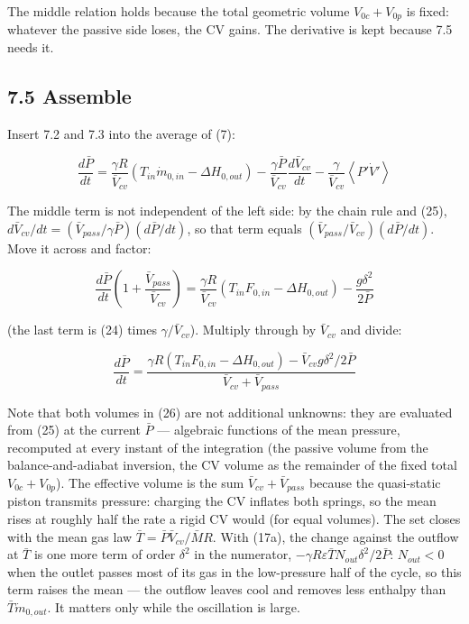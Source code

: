 \documentclass[11pt]{article}
\begin{document}
The middle relation holds because the total geometric volume $V_{0c} + V_{0p}$ is fixed: whatever the passive side loses, the CV gains. The derivative is kept because 7.5 needs it.

\subsection*{7.5 Assemble}

Insert 7.2 and 7.3 into the average of (7):

\[
\frac{d\bar P}{dt} = \frac{\gamma R}{\bar V_{cv}}\left(T_{in}\dot m_{0,in} - \Delta H_{0,out}\right) - \frac{\gamma\bar P}{\bar V_{cv}}\frac{d\bar V_{cv}}{dt} - \frac{\gamma}{\bar V_{cv}}\left\langle P'\dot V'\right\rangle
\]

The middle term is not independent of the left side: by the chain rule and (25), $d\bar V_{cv}/dt = (\bar V_{pass}/\gamma\bar P)(d\bar P/dt)$, so that term equals $(\bar V_{pass}/\bar V_{cv})(d\bar P/dt)$. Move it across and factor:

\[
\frac{d\bar P}{dt}\left(1 + \frac{\bar V_{pass}}{\bar V_{cv}}\right) = \frac{\gamma R}{\bar V_{cv}}\left(T_{in}F_{0,in} - \Delta H_{0,out}\right) - \frac{g\delta^2}{2\bar P}
\]

(the last term is (24) times $\gamma/\bar V_{cv}$). Multiply through by $\bar V_{cv}$ and divide:

\begin{equation}
\frac{d\bar P}{dt} = \frac{\gamma R\left(T_{in}F_{0,in} - \Delta H_{0,out}\right) - \bar V_{cv}g\delta^2/2\bar P}{\bar V_{cv} + \bar V_{pass}} \tag{26}
\end{equation}

Note that both volumes in (26) are not additional unknowns: they are evaluated from (25) at the current $\bar P$ --- algebraic functions of the mean pressure, recomputed at every instant of the integration (the passive volume from the balance-and-adiabat inversion, the CV volume as the remainder of the fixed total $V_{0c} + V_{0p}$). The effective volume is the sum $\bar V_{cv} + \bar V_{pass}$ because the quasi-static piston transmits pressure: charging the CV inflates both springs, so the mean rises at roughly half the rate a rigid CV would (for equal volumes). The set closes with the mean gas law $\bar T = \bar P\bar V_{cv}/\bar MR$. With (17a), the change against the outflow at $\bar T$ is one more term of order $\delta^2$ in the numerator, $-\gamma R\varepsilon\bar TN_{out}\delta^2/2\bar P$: $N_{out} < 0$ when the outlet passes most of its gas in the low-pressure half of the cycle, so this term raises the mean --- the outflow leaves cool and removes less enthalpy than $\bar T\dot m_{0,out}$. It matters only while the oscillation is large.
\end{document}
